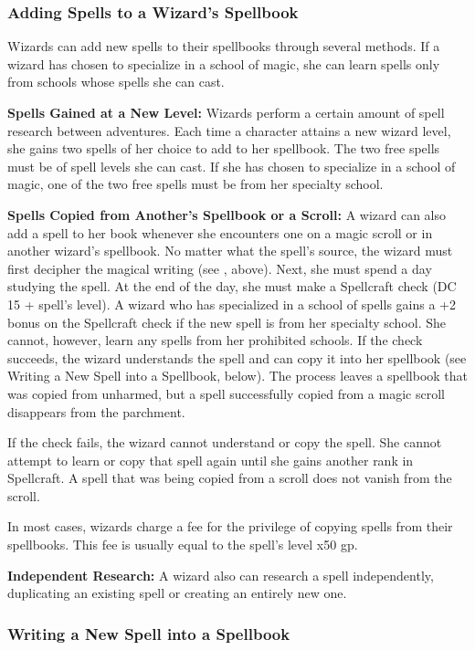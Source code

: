 \subsubsection{Adding Spells to a Wizard's Spellbook}

Wizards can add new spells to their spellbooks through several methods. If a wizard 
has chosen to specialize in a school of magic, she can learn spells only from schools 
whose spells she can cast.

\textbf{Spells Gained at a New Level:} Wizards perform a certain amount of spell 
research between adventures. Each time a character attains a new wizard level, 
she gains two spells of her choice to add to her spellbook. The two free spells 
must be of spell levels she can cast. If she has chosen to specialize in a school 
of magic, one of the two free spells must be from her specialty school.

\textbf{Spells Copied from Another's Spellbook or a Scroll:} A wizard can also 
add a spell to her book whenever she encounters one on a magic scroll or in another 
wizard's spellbook. No matter what the spell's source, the wizard must first decipher 
the magical writing (see , above). Next, she must spend 
a day studying the spell. At the end of the day, she must make a Spellcraft check 
(DC 15 + spell's level). A wizard who has specialized in a school of spells gains 
a +2 bonus on the Spellcraft check if the new spell is from her specialty school. 
She cannot, however, learn any spells from her prohibited schools. If the check 
succeeds, the wizard understands the spell and can copy it into her spellbook (see 
Writing a New Spell into a Spellbook, below). The process leaves a spellbook that 
was copied from unharmed, but a spell successfully copied from a magic scroll disappears 
from the parchment.

If the check fails, the wizard cannot understand or copy the spell. She cannot 
attempt to learn or copy that spell again until she gains another rank in Spellcraft. 
A spell that was being copied from a scroll does not vanish from the scroll.

In most cases, wizards charge a fee for the privilege of copying spells from their 
spellbooks. This fee is usually equal to the spell's level x50 gp.

\textbf{Independent Research:} A wizard also can research a spell independently, 
duplicating an existing spell or creating an entirely new one.

\subsubsection{Writing a New Spell into a Spellbook}

